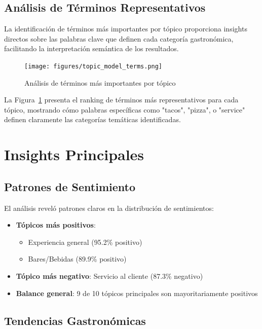 \documentclass[12pt,a4paper,twoside,openany]{book}
\begin{document}
\subsection{Análisis de Términos Representativos}

La identificación de términos más importantes por tópico proporciona insights directos sobre las palabras clave que definen cada categoría gastronómica, facilitando la interpretación semántica de los resultados.

\begin{figure}[htbp]
\centering
\texttt{[image: figures/topic\_model\_terms.png]}
\caption{Análisis de términos más importantes por tópico}
\label{fig:topic_model_terms}
\end{figure}

La Figura~\ref{fig:topic_model_terms} presenta el ranking de términos más representativos para cada tópico, mostrando cómo palabras específicas como "tacos", "pizza", o "service" definen claramente las categorías temáticas identificadas.

\section{Insights Principales}

\subsection{Patrones de Sentimiento}

El análisis reveló patrones claros en la distribución de sentimientos:

\begin{itemize}
    \item \textbf{Tópicos más positivos}:
        \begin{itemize}
            \item Experiencia general (95.2\% positivo)
            \item Bares/Bebidas (89.9\% positivo)
        \end{itemize}
    \item \textbf{Tópico más negativo}: Servicio al cliente (87.3\% negativo)
    \item \textbf{Balance general}: 9 de 10 tópicos principales son mayoritariamente positivos
\end{itemize}

\subsection{Tendencias Gastronómicas}
\end{document}
